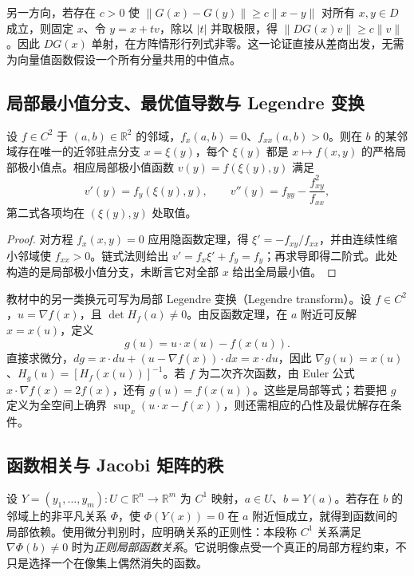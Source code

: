 另一方向，若存在 $c>0$ 使 $\|G(x)-G(y)\|\ge c\|x-y\|$ 对所有 $x,y\in D$ 成立，则固定 $x$、令 $y=x+tv$，除以 $|t|$ 并取极限，得 $\|DG(x)v\|\ge c\|v\|$。因此 $DG(x)$ 单射，在方阵情形行列式非零。这一论证直接从差商出发，无需为向量值函数假设一个所有分量共用的中值点。

\subsection{局部最小值分支、最优值导数与 Legendre 变换}

\begin{proposition}
\label{prop:pei-local-envelope}
设 $f\in C^2$ 于 $(a,b)\in\mathbb R^2$ 的邻域，$f_x(a,b)=0$、$f_{xx}(a,b)>0$。则在 $b$ 的某邻域存在唯一的近邻驻点分支 $x=\xi(y)$，每个 $\xi(y)$ 都是 $x\mapsto f(x,y)$ 的严格局部极小值点。相应局部极小值函数 $v(y)=f(\xi(y),y)$ 满足
\[
v'(y)=f_y(\xi(y),y),\qquad
v''(y)=f_{yy}-\frac{f_{xy}^2}{f_{xx}},
\]
第二式各项均在 $(\xi(y),y)$ 处取值。
\end{proposition}
\begin{proof}
对方程 $f_x(x,y)=0$ 应用隐函数定理，得 $\xi'=-f_{xy}/f_{xx}$，并由连续性缩小邻域使 $f_{xx}>0$。链式法则给出 $v'=f_x\xi'+f_y=f_y$；再求导即得二阶式。此处构造的是局部极小值分支，未断言它对全部 $x$ 给出全局最小值。
\end{proof}

教材中的另一类换元可写为局部 Legendre 变换（Legendre transform）。设 $f\in C^2$，$u=\nabla f(x)$，且 $\det H_f(a)\ne0$。由反函数定理，在 $a$ 附近可反解 $x=x(u)$，定义
\[
g(u)=u\cdot x(u)-f(x(u)).
\]
直接求微分，$dg=x\cdot du+(u-\nabla f(x))\cdot dx=x\cdot du$，因此 $\nabla g(u)=x(u)$、$H_g(u)=[H_f(x(u))]^{-1}$。若 $f$ 为二次齐次函数，由 Euler 公式 $x\cdot\nabla f(x)=2f(x)$，还有 $g(u)=f(x(u))$。这些是局部等式；若要把 $g$ 定义为全空间上确界 $\sup_x(u\cdot x-f(x))$，则还需相应的凸性及最优解存在条件。

\subsection{函数相关与 Jacobi 矩阵的秩}

设 $Y=(y_1,\ldots,y_m):U\subset\mathbb R^n\to\mathbb R^m$ 为 $C^1$ 映射，$a\in U$、$b=Y(a)$。若存在 $b$ 的邻域上的非平凡关系 $\Phi$，使 $\Phi(Y(x))=0$ 在 $a$ 附近恒成立，就得到函数间的局部依赖。使用微分判别时，应明确关系的正则性：本段称 $C^1$ 关系满足 $\nabla\Phi(b)\ne0$ 时为\emph{正则局部函数关系}。它说明像点受一个真正的局部方程约束，不只是选择一个在像集上偶然消失的函数。

